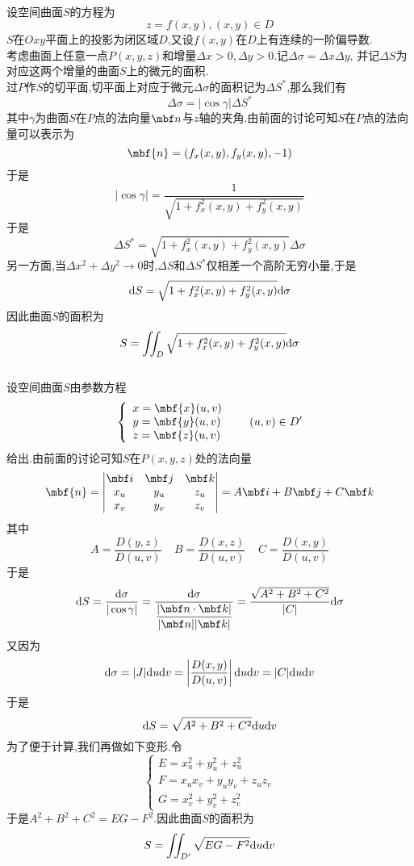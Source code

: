 \documentclass{ctexart}
\begin{document}
\pagestyle{empty}
\begin{center}\large{}\end{center}
\\
设空间曲面$S$的方程为\[z=f(x,y),(x,y)\in D\]
$S$在$Oxy$平面上的投影为闭区域$D$,又设$f(x,y)$在$D$上有连续的一阶偏导数.\\
考虑曲面上任意一点$P(x,y,z)$和增量$\Delta x>0,\Delta y>0$.记$\Delta\sigma=\Delta x\Delta y$,%
并记$\Delta S$为对应这两个增量的曲面$S$上的微元的面积.\\
过$P$作$S$的切平面,切平面上对应于微元$\Delta\sigma$的面积记为$\Delta S^*$,那么我们有
\[\Delta\sigma=|\cos\gamma|\Delta S^*\]
其中$\gamma$为曲面$S$在$P$点的法向量$\mbf n$与$z$轴的夹角.由前面的讨论可知$S$在$P$点的法向量可以表示为
\[\mbf{n}=\left(f_x(x,y),f_y(x,y),-1\right)\]
于是\[|\cos\gamma|=\dfrac{1}{\sqrt{1+f_x^2(x,y)+f_y^2(x,y)}}\]
于是
\[\Delta S^*=\sqrt{1+f_x^2(x,y)+f_y^2(x,y)}\Delta\sigma\]
另一方面,当$\Delta x^2+\Delta y^2\to0$时,$\Delta S$和$\Delta S^*$仅相差一个高阶无穷小量,于是
\[\mathrm{d} S=\sqrt{1+f_x^2(x,y)+f_y^2(x,y)}\mathrm{d}\sigma\]
因此曲面$S$的面积为
\[S=\iint_{D}\sqrt{1+f_x^2(x,y)+f_y^2(x,y)}\mathrm{d}\sigma\]
\\
设空间曲面$S$由参数方程
\[\left\{\begin{array}{l}
    x=\mbf{x}(u,v)\\y=\mbf{y}(u,v)\\z=\mbf{z}(u,v)
\end{array}\right.\ \ \ \ \ (u,v)\in D'\]
给出.由前面的讨论可知$S$在$P(x,y,z)$处的法向量
\[\mbf{n}=\begin{vmatrix}
    \mbf i & \mbf j & \mbf k \\
    x_u & y_u & z_u \\
    x_v & y_v & z_v
\end{vmatrix}=A\mbf i+B\mbf j+C\mbf k\]
其中
\[A=\dfrac{D(y,z)}{D(u,v)}\ \ \ \ \ B=\dfrac{D(x,z)}{D(u,v)}\ \ \ \ \ C=\dfrac{D(x,y)}{D(u,v)}\]
于是
\[\di S=\dfrac{\di\sigma}{|\cos\gamma|}=\dfrac{\di\sigma}{\dfrac{|\mbf n\cdot\mbf k|}{|\mbf n||\mbf k|}}=\dfrac{\sqrt{A^2+B^2+C^2}}{|C|}\di\sigma\]
又因为
\[\mathrm{d}\sigma=|J|\mathrm{d} u\mathrm{d} v=\left|\dfrac{D(x,y)}{D(u,v)}\right|\mathrm{d} u\mathrm{d} v=|C|\mathrm{d} u\mathrm{d} v\]
于是
\[\mathrm{d} S=\sqrt{A^2+B^2+C^2}\mathrm{d} u\mathrm{d} v\]
为了便于计算,我们再做如下变形.令
\[\left\{\begin{array}{l}
    E=x_u^2+y_u^2+z_u^2\\
    F=x_ux_v+y_uy_v+z_uz_v\\
    G=x_v^2+y_v^2+z_v^2
\end{array}\right.\]
于是$A^2+B^2+C^2=EG-F^2$.因此曲面$S$的面积为
\[S=\iint_{D'}\sqrt{EG-F^2}\mathrm{d} u\mathrm{d} v\]
\end{document}
